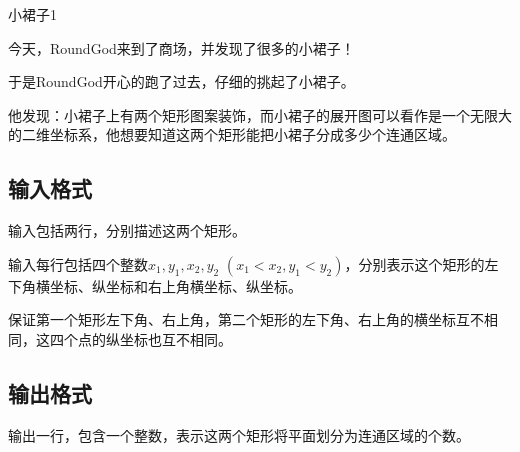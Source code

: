 \begin{Problem}{小裙子}{1}

今天，RoundGod来到了商场，并发现了很多的小裙子！

于是RoundGod开心的跑了过去，仔细的挑起了小裙子。

他发现：小裙子上有两个矩形图案装饰，而小裙子的展开图可以看作是一个无限大的二维坐标系，他想要知道这两个矩形能把小裙子分成多少个连通区域。

\subsection*{输入格式}

输入包括两行，分别描述这两个矩形。

输入每行包括四个整数$x_1, y_1, x_2, y_2$ $(x_1 < x_2, y_1 < y_2)$，分别表示这个矩形的左下角横坐标、纵坐标和右上角横坐标、纵坐标。

保证第一个矩形左下角、右上角，第二个矩形的左下角、右上角的横坐标互不相同，这四个点的纵坐标也互不相同。

\subsection*{输出格式}

输出一行，包含一个整数，表示这两个矩形将平面划分为连通区域的个数。


\end{Problem}
